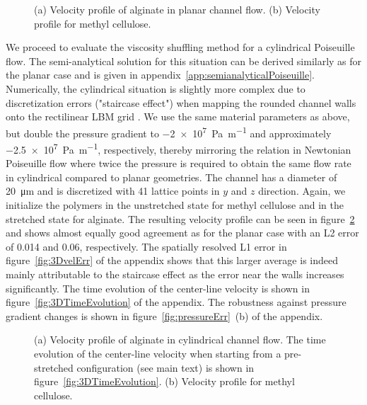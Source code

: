 \documentclass[a4paper,12pt]{scrartcl}
\begin{document}
	\begin{figure}[H]
		\centering
		\caption{(a) Velocity profile of alginate in planar channel flow.
		(b) Velocity profile for methyl cellulose.}
		\label{fig:2Dvel}
	\end{figure}

We proceed to evaluate the viscosity shuffling method for a cylindrical Poiseuille flow.
The semi-analytical solution for this situation can be derived similarly as for the planar case and is given in appendix~\ref{app:semianalyticalPoiseuille}.
Numerically, the cylindrical situation is slightly more complex due to discretization errors ("staircase effect") when mapping the rounded channel walls onto the rectilinear LBM grid \cite{Lehmann.20229da}.
We use the same material parameters as above, but double the pressure gradient to \SI{-2e7}{\pascal\per\meter} and approximately \SI{-2.5e7}{\pascal\per\meter}, respectively, thereby mirroring the relation in Newtonian Poiseuille flow where twice the pressure is required to obtain the same flow rate in cylindrical compared to planar geometries.
The channel has a diameter of \SI{20}{\micro\meter} and is discretized with 41 lattice points in $y$ and $z$ direction.
Again, we initialize the polymers in the unstretched state for methyl cellulose and in the stretched state for alginate.
The resulting velocity profile can be seen in figure~\ref{fig:3Dvel} and shows almost equally good agreement as for the planar case with an L2 error of \num{0.014} and \num{0.06}, respectively.
The spatially resolved L1 error in figure~\ref{fig:3DvelErr} of the appendix shows that this larger average is indeed mainly attributable to the staircase effect as the error near the walls increases significantly.
The time evolution of the center-line velocity is shown in figure~\ref{fig:3DTimeEvolution} of the appendix.
The robustness against pressure gradient changes is shown in figure~\ref{fig:pressureErr}~(b) of the appendix.

	\begin{figure}[H]
		\centering
		\caption{(a) Velocity profile of alginate in cylindrical channel flow.
		The time evolution of the center-line velocity when starting from a pre-stretched configuration (see main text) is shown in figure~\ref{fig:3DTimeEvolution}.
		(b) Velocity profile for methyl cellulose.}
		\label{fig:3Dvel}
	\end{figure}
\end{document}
